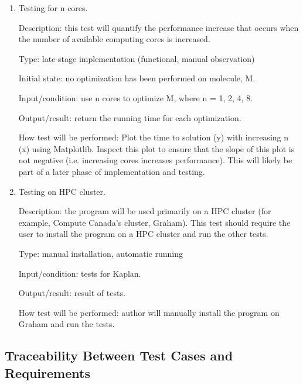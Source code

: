 \documentclass[12pt, titlepage]{article}
\newcommand{\progname}{Kaplan} %
\begin{document}
\begin{enumerate}
	\item Testing for n cores.
	
	Description: this test will quantify the performance increase that occurs 
	when the number of available computing cores is increased.
	
	Type: late-stage implementation (functional, manual observation)
	
	Initial state: no optimization has been performed on molecule, M.
	
	Input/condition: use n cores to optimize M, where n = 1, 2, 4, 8.
	
	Output/result: return the running time for each optimization. 
	
	How test will be performed: Plot the time to solution (y) with increasing n 
	(x) using Matplotlib. Inspect this plot to ensure that the slope of this 
	plot is not negative (i.e. increasing cores increases performance). This 
	will likely be part of a later phase of implementation and
        testing. 
	
	\item Testing on HPC cluster.
	
	Description: the program will be used primarily on a HPC cluster (for 
	example, Compute Canada's cluster, Graham). This test should require the 
	user to install the program on a HPC cluster and run the other tests.
	
	Type: manual installation, automatic running
	
	Input/condition: tests for \progname{}.
	
	Output/result: result of tests.
	
	How test will be performed: author will manually install the program on 
	Graham and run the tests. 
	
	
\end{enumerate}

\subsection{Traceability Between Test Cases and 
Requirements}\label{section-tables}

\end{document}
